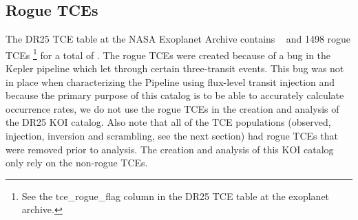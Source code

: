 \subsection{Rogue TCEs}
The DR25 TCE table at the NASA Exoplanet Archive contains \ntcesnorogue\  and 1498 rogue TCEs \footnote{See the tce\_rogue\_flag column in the DR25 TCE table at the exoplanet archive.} for a total of \ntces. The rogue TCEs were created because of a bug in the Kepler pipeline which let through certain three-transit events.  This bug was not in place when characterizing the Pipeline using flux-level transit injection \citep[see][]{Burke2017a,Burke2017b} and because the primary purpose of this catalog is to be able to accurately calculate occurrence rates, we do not use the rogue TCEs in the creation and analysis of the DR25 KOI catalog. Also note that all of the TCE populations (observed, injection, inversion and scrambling, see the next section) had rogue TCEs that were removed prior to analysis. The creation and analysis of this KOI catalog only rely on the non-rogue TCEs. 

